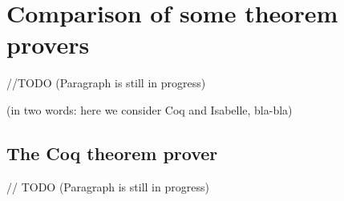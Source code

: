\documentclass[article]{aaltoseries}
\begin{document}

\section{Comparison of some theorem provers}
\label{sec:comparison}

//TODO (Paragraph is still in progress) 

(in two words: here we consider Coq and Isabelle, bla-bla)





\subsection{The Coq theorem prover}
\label{sec:prover_coq}

// TODO (Paragraph is still in progress)
\end{document}
